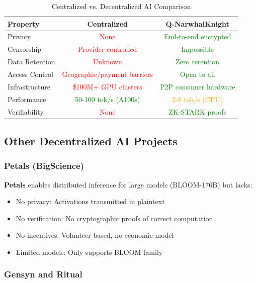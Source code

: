 \documentclass[11pt,a4paper]{article}
\begin{document}
\begin{table}[H]
\centering
\caption{Centralized vs. Decentralized AI Comparison}
\begin{tabular}{|l|c|c|}
\hline
\textbf{Property} & \textbf{Centralized} & \textbf{Q-NarwhalKnight} \\
\hline
Privacy & \textcolor{red}{None} & \textcolor{green}{End-to-end encrypted} \\
Censorship & \textcolor{red}{Provider controlled} & \textcolor{green}{Impossible} \\
Data Retention & \textcolor{red}{Unknown} & \textcolor{green}{Zero retention} \\
Access Control & \textcolor{red}{Geographic/payment barriers} & \textcolor{green}{Open to all} \\
Infrastructure & \textcolor{red}{\$100M+ GPU clusters} & \textcolor{green}{P2P consumer hardware} \\
Performance & \textcolor{green}{50-100 tok/s (A100s)} & \textcolor{orange}{2-8 tok/s (CPU)} \\
Verifiability & \textcolor{red}{None} & \textcolor{green}{ZK-STARK proofs} \\
\hline
\end{tabular}
\end{table}

\subsection{Other Decentralized AI Projects}

\subsubsection{Petals (BigScience)}

\textbf{Petals} enables distributed inference for large models (BLOOM-176B) but lacks:
\begin{itemize}
    \item No privacy: Activations transmitted in plaintext
    \item No verification: No cryptographic proofs of correct computation
    \item No incentives: Volunteer-based, no economic model
    \item Limited models: Only supports BLOOM family
\end{itemize}

\subsubsection{Gensyn and Ritual}
\end{document}
